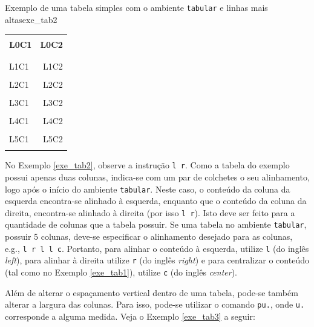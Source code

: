 \begin{texexptitled}[breakable,center lower,enhanced,middle=2mm]{Exemplo de uma tabela simples com o ambiente {\tt tabular} e linhas mais altas}{exe_tab2}
\begin{tabular}{l r}
\hline 
\\[-0.5em]
\textbf{L0C1} & \textbf{L0C2} \\
\\[-0.5em]
\hline
\\[-0.5em]
L1C1 & L1C2 \\
\\[-0.5em]
L2C1 & L2C2 \\
\\[-0.5em]
L3C1 & L3C2 \\
\\[-0.5em]
L4C1 & L4C2 \\
\\[-0.5em]
L5C1 & L5C2 \\
\\[-0.5em]
\hline
\end{tabular}
\end{texexptitled}

No Exemplo \ref{exe_tab2}, observe a instrução \texttt{{l r}}. Como a tabela do exemplo possui apenas duas colunas, indica-se com um par de colchetes o seu alinhamento, logo após o início do ambiente {\tt tabular}. Neste caso, o conteúdo da coluna da esquerda encontra-se alinhado à esquerda, enquanto que o conteúdo da coluna da direita, encontra-se alinhado à direita (por isso {\tt l r}). Isto deve ser feito para a quantidade de colunas que a tabela possuir. Se uma tabela no ambiente {\tt tabular}, possuir 5 colunas, deve-se especificar o alinhamento desejado para as colunas, e.g., \texttt{{l r l l c}}. Portanto, para alinhar o conteúdo à esquerda, utilize {\tt l} (do inglês \textit{left}), para alinhar à direita utilize {\tt r} (do inglês \textit{right}) e para centralizar o conteúdo (tal como no Exemplo \ref{exe_tab1}), utilize {\tt c} (do inglês \textit{center}).

Além de alterar o espaçamento vertical dentro de uma tabela, pode-se também alterar a largura das colunas. Para isso, pode-se utilizar o comando \texttt{p{u.}}, onde {\tt u.} corresponde a alguma medida. Veja o Exemplo \ref{exe_tab3} a seguir:

